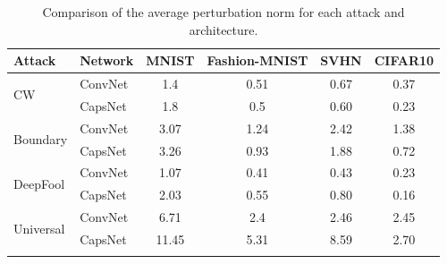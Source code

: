 \documentclass{article}
\begin{document}
\begin{table}[h]
	\caption{Comparison of the average perturbation norm for each attack and architecture.}
	\vskip 0.15in
	\centering
	\begin{tabular}{llcccc}
		\toprule
		Attack & Network       & MNIST & Fashion-MNIST & SVHN & CIFAR10  \\
		\midrule
		\multirow{2}{*}{CW} & ConvNet & 1.4 & 0.51 & 0.67 & 0.37 \\
		& CapsNet            & 1.8 & 0.5 & 0.60 & 0.23 \\
		\midrule
		\multirow{2}{*}{Boundary} & ConvNet & 3.07 & 1.24 & 2.42 & 1.38 \\
		& CapsNet            & 3.26 & 0.93 & 1.88 & 0.72 \\
		\midrule
		\multirow{2}{*}{DeepFool} & ConvNet & 1.07 & 0.41 & 0.43 & 0.23 \\
		& CapsNet           & 2.03 & 0.55 & 0.80 & 0.16 \\
		\midrule
		\multirow{2}{*}{Universal} & ConvNet & 6.71 & 2.4 & 2.46 & 2.45 \\
		& CapsNet           & 11.45 & 5.31 & 8.59 & 2.70 \\
		\bottomrule\\
	\end{tabular}
	\label{tab:norms}
\end{table}
\end{document}
